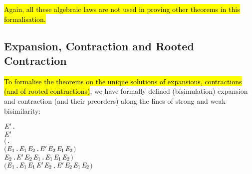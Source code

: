 \hl{Again, all these algebraic laws are not used in proving other theorems
in this formalisation.}

\subsection{Expansion, Contraction and Rooted Contraction}

\hl{To formalise the theorems on the unique solutions of expansions,
contractions (and of rooted contractions)}, we have formally defined
 (bisimulation) expansion and contraction (and their preorders) along
 the lines of strong and weak bisimilarity:
\begin{alltt}
     \HOLTokenDefEquality{}
     \HOLSymConst{\HOLTokenForall{}} \ensuremath{\HOLBoundVar{E}\sp{\prime}}.
           \ensuremath{\HOLBoundVar{E}\sp{\prime}} \HOLSymConst{\HOLTokenImp{}}
         \ensuremath{(}\HOLSymConst{\HOLTokenForall{}}.
              \ensuremath{(}\HOLSymConst{\HOLTokenForall{}}\ensuremath{\HOLBoundVar{E}\sb{\mathrm{1}}}.  \HOLTokenTransBegin{} \HOLTokenTransEnd \ensuremath{\HOLBoundVar{E}\sb{\mathrm{1}}} \HOLSymConst{\HOLTokenImp{}} \HOLSymConst{\HOLTokenExists{}}\ensuremath{\HOLBoundVar{E}\sb{\mathrm{2}}}. \ensuremath{\HOLBoundVar{E}\sp{\prime}} \HOLTokenTransBegin{} \HOLTokenTransEnd \ensuremath{\HOLBoundVar{E}\sb{\mathrm{2}}} \HOLSymConst{\HOLTokenConj{}}  \ensuremath{\HOLBoundVar{E}\sb{\mathrm{1}}} \ensuremath{\HOLBoundVar{E}\sb{\mathrm{2}}}\ensuremath{)} \HOLSymConst{\HOLTokenConj{}}
              \HOLSymConst{\HOLTokenForall{}}\ensuremath{\HOLBoundVar{E}\sb{\mathrm{2}}}. \ensuremath{\HOLBoundVar{E}\sp{\prime}} \HOLTokenTransBegin{} \HOLTokenTransEnd \ensuremath{\HOLBoundVar{E}\sb{\mathrm{2}}} \HOLSymConst{\HOLTokenImp{}} \HOLSymConst{\HOLTokenExists{}}\ensuremath{\HOLBoundVar{E}\sb{\mathrm{1}}}.  \HOLTokenWeakTransBegin{} \HOLTokenWeakTransEnd \ensuremath{\HOLBoundVar{E}\sb{\mathrm{1}}} \HOLSymConst{\HOLTokenConj{}}  \ensuremath{\HOLBoundVar{E}\sb{\mathrm{1}}} \ensuremath{\HOLBoundVar{E}\sb{\mathrm{2}}}\ensuremath{)} \HOLSymConst{\HOLTokenConj{}}
         \ensuremath{(}\HOLSymConst{\HOLTokenForall{}}\ensuremath{\HOLBoundVar{E}\sb{\mathrm{1}}}.  \HOLTokenTransBegin\HOLSymConst{\ensuremath{\tau}}\HOLTokenTransEnd \ensuremath{\HOLBoundVar{E}\sb{\mathrm{1}}} \HOLSymConst{\HOLTokenImp{}}  \ensuremath{\HOLBoundVar{E}\sb{\mathrm{1}}} \ensuremath{\HOLBoundVar{E}\sp{\prime}} \HOLSymConst{\HOLTokenDisj{}} \HOLSymConst{\HOLTokenExists{}}\ensuremath{\HOLBoundVar{E}\sb{\mathrm{2}}}. \ensuremath{\HOLBoundVar{E}\sp{\prime}} \HOLTokenTransBegin\HOLSymConst{\ensuremath{\tau}}\HOLTokenTransEnd \ensuremath{\HOLBoundVar{E}\sb{\mathrm{2}}} \HOLSymConst{\HOLTokenConj{}}  \ensuremath{\HOLBoundVar{E}\sb{\mathrm{1}}} \ensuremath{\HOLBoundVar{E}\sb{\mathrm{2}}}\ensuremath{)} \HOLSymConst{\HOLTokenConj{}}

\end{alltt}
